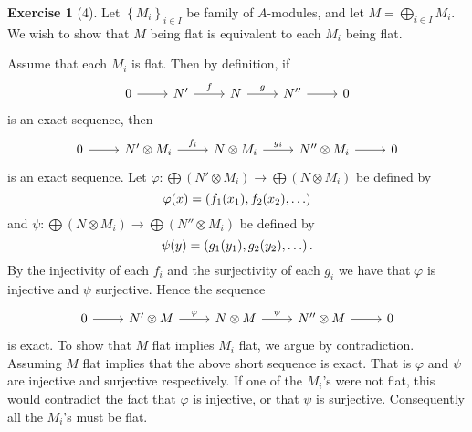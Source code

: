 \documentclass{article}
\theoremstyle{definition}
\newtheorem*{exercise}{Exercise}
\begin{document}
\begin{exercise}[4]
    Let $\left\{ M_i \right\}_{i \in I}$ be family of $A$-modules, and let $M =
    \bigoplus_{i \in I}M_i$.  We wish to show that $M$ being flat is equivalent
    to each $M_i$ being flat.
    
    Assume that each $M_i$ is flat. Then by definition, if
    \[
        \begin{tikzcd}
            0 \arrow[r] & N' \arrow[r, "f"] & N \arrow[r, "g"] & N'' \arrow[r] & 0
        \end{tikzcd}
    \]
    is an exact sequence, then 
    \[
        \begin{tikzcd}
            0 \arrow[r] & N'\otimes M_i \arrow[r, "f_i"] & N \otimes M_i\arrow[r, "g _i"] & N''\otimes M_i \arrow[r]& 0
        \end{tikzcd}
    \] is an exact sequence. Let $\varphi \colon \bigoplus (N' \otimes M_i) \to
    \bigoplus (N \otimes M_i)$ be defined by
    \begin{equation}
        \notag
        \varphi(x) = \left( f_1(x_1), f_2(x_2), \ldots \right)
    \end{equation}
    and $\psi \colon \bigoplus (N \otimes M_i) \to \bigoplus (N'' \otimes M_i)$
    be defined by 
    \begin{equation}
        \notag
        \psi(y) = \left( g_1(y_1), g_2(y_2), \ldots \right).
    \end{equation}
    By the injectivity of each $f_i$ and the surjectivity of each $g_i$ we have
    that $\varphi$ is injective and $\psi$ surjective. Hence the sequence
    \[
        \begin{tikzcd}
            0 \arrow[r] & N' \otimes M \arrow[r, "\varphi"] & N \otimes M \arrow[r, "\psi"] & N'' \otimes M \arrow[r] & 0 
        \end{tikzcd}
    \]
    is exact. To show that $M$ flat implies $M_i$ flat, we argue by
    contradiction. Assuming $M$ flat implies that the above short sequence is
    exact. That is $\varphi$ and $\psi$ are injective and surjective
    respectively. If one of the $M_i$'s were not flat, this would contradict
    the fact that $\varphi$ is injective, or that $\psi$ is surjective.
    Consequently all the $M_i$'s must be flat.
\end{exercise}
\end{document}
